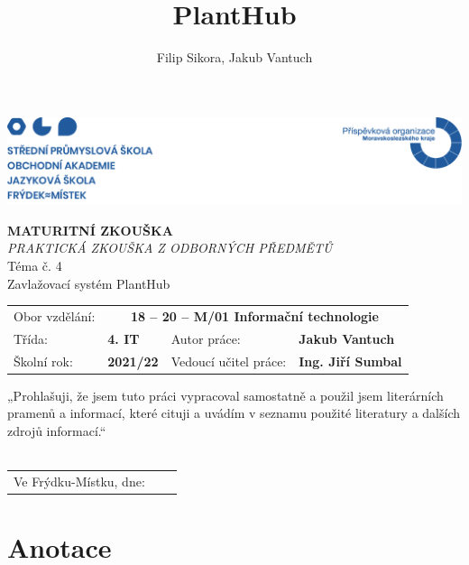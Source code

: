 \documentclass[12pt,a4paper]{article}
\title{PlantHub}
\author{Filip Sikora, Jakub Vantuch}
\date{}
\begin{document}
\renewcommand\refname{}

\begin{titlepage}
	\begin{adjustwidth}{-20mm}{-7.5mm} 
		\vspace*{-1.5cm}
		\noindent\includegraphics[width=\linewidth]{header.png}
	\end{adjustwidth}
	\begin{center}
		\vspace*{0.2cm}
		\Huge\textbf{MATURITNÍ ZKOUŠKA}
		\vspace*{1cm} \\
		\large \emph{PRAKTICKÁ ZKOUŠKA Z ODBORNÝCH PŘEDMĚTŮ}
		\vspace*{1cm} \\
		\Large Téma č. 4 \\
		\vspace*{1cm}
		\Large Zavlažovací systém PlantHub \\
		\vfill
		\normalsize
	\end{center}
	\begin{tabularx}{\textwidth}{l@{\hskip 0.5cm}XXl}
		Obor vzdělání: & \multicolumn{3}{c}{\textbf{18 – 20 – M/01 Informační technologie}} \\[10pt]
		Třída: & \textbf{4. IT} & Autor práce: & \textbf{Jakub Vantuch} \\[10pt]
		Školní rok: & \textbf{2021/22} & Vedoucí učitel práce: & \textbf{Ing. Jiří Sumbal}
		\vspace*{1cm}
	\end{tabularx}
	„Prohlašuji, že jsem tuto práci vypracoval samostatně a použil jsem literárních pramenů a informací, které cituji a uvádím v seznamu použité literatury a dalších zdrojů informací.“ \\
	\vspace*{0.5cm} \\
	\begin{tabularx}{\textwidth}{l@{\hskip 1cm}X@{\hskip 1cm}X}
		Ve Frýdku-Místku, dne: & \dotfill & \dotfill
	\end{tabularx}
\end{titlepage}

\clearpage

\section*{Anotace}
\end{document}
